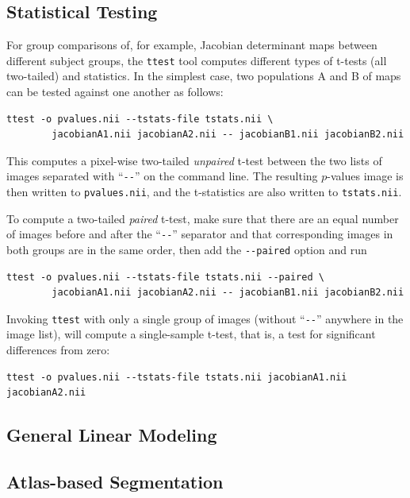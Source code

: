 \documentclass{InsightArticle}
\begin{document}
\subsection{Statistical Testing}

For group comparisons of, for example, Jacobian determinant maps between
different subject groups, the \verb|ttest| tool computes different types of
t-tests (all two-tailed) and statistics. In the simplest case, two populations
A and B of maps can be tested against one another as follows:
\begin{verbatim}
ttest -o pvalues.nii --tstats-file tstats.nii \
        jacobianA1.nii jacobianA2.nii -- jacobianB1.nii jacobianB2.nii
\end{verbatim} 
This computes a pixel-wise two-tailed {\em unpaired\/} t-test between the two
lists of images separated with ``\verb|--|'' on the command line. The
resulting $p$-values image is then written to \verb|pvalues.nii|, and the
t-statistics are also written to \verb|tstats.nii|.

To compute a two-tailed {\em paired\/} t-test, make sure that there are an
equal number of images before and after the ``\verb|--|'' separator and that
corresponding images in both groups are in the same order, then add the
\verb|--paired| option and run
\begin{verbatim}
ttest -o pvalues.nii --tstats-file tstats.nii --paired \
        jacobianA1.nii jacobianA2.nii -- jacobianB1.nii jacobianB2.nii
\end{verbatim}
Invoking \verb|ttest| with only a single group of images (without
``\verb|--|'' anywhere in the image list), will compute a single-sample
t-test, that is, a test for significant differences from zero:
\begin{verbatim}
ttest -o pvalues.nii --tstats-file tstats.nii jacobianA1.nii jacobianA2.nii
\end{verbatim} 

\subsection{General Linear Modeling}

\cite{FrisHolmWors:1995}

\subsection{Atlas-based Segmentation}
\end{document}
